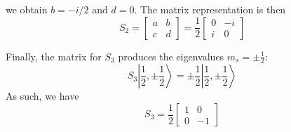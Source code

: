\documentclass[../../../main.tex]{subfiles}
\begin{document}
we obtain $b=-i/2$ and $d=0$.
The matrix representation is then 
\begin{equation*}
    S_2 = 
\begin{bmatrix}
a & b \\
c & d 
\end{bmatrix}=
\frac{1  }{2}
\begin{bmatrix}
0 & -i \\
i & 0 
\end{bmatrix}
\end{equation*}

Finally, the matrix for $S_3$ produces the eigenvalues $m_s = \pm \frac{1}{2}$:
\begin{equation*}
    S_3 \left| \frac{1}{2}, \pm \frac{1}{2} \right\rangle = \pm \frac{1}{2} \left| \frac{1}{2}, \pm \frac{1}{2} \right\rangle
\end{equation*}
As such, we have 
\begin{equation*}
S_3 = \frac{1}{2} \begin{bmatrix}
1  & 0 \\
0  & -1
\end{bmatrix}
\end{equation*}
\end{document}
